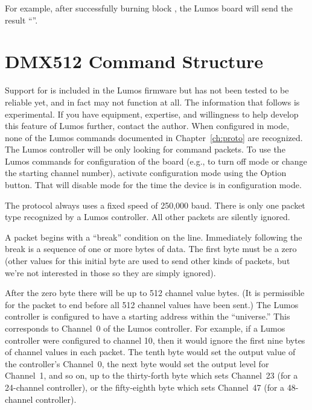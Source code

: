 \documentclass[letterpaper,twoside,onecolumn,openright,final]{memoir}
\begin{document}
For example, after successfully burning block , the Lumos board
will send the result ``''.


\chapter{DMX512 Command Structure}\label{ch:dmx}
\begin{NotImplemented*}{Support for  is included in the Lumos firmware but has not
been tested to be reliable yet, and in fact may not function at all.  The information that follows
is experimental.  If you have  equipment, expertise, and willingness to help develop
this feature of Lumos further, contact the author.}
When configured in  mode, none of the Lumos commands documented in Chapter~\ref{ch:proto}
are recognized. The Lumos controller will be only looking for  command packets.
To use the Lumos commands for configuration of the board (e.g., to turn off  mode or change
the starting channel number), activate configuration mode using the Option button.  That will disable  mode for the time the device is in configuration mode.

The  protocol always uses a fixed speed of 250,000 baud.  There is only one packet type 
recognized by a Lumos controller.  All other packets are silently ignored.

A packet begins with a ``break'' condition on the line.  Immediately following the break is a sequence
of one or more bytes of data.  The first byte must be a zero (other values for this initial byte are used
to send other kinds of  packets, but we're not interested in those so they are simply
ignored).

After the zero byte there will be up to 512 channel value bytes.  (It is permissible for the packet to end
before all 512 channel values have been sent.)  The Lumos controller is configured to have a starting address
within the  ``universe.'' This corresponds to Channel~0 of the Lumos controller.  For example,
if a Lumos controller were configured to  channel 10, then it would ignore the first nine
bytes of channel values in each packet.  The tenth byte would set the output value of the controller's Channel~0, the next byte would set the output level for Channel~1, and so on, up to the thirty-forth byte
which sets Channel~23 (for a 24-channel controller), or the fifty-eighth byte which sets Channel~47 (for
a 48-channel controller).


\end{NotImplemented*}
\end{document}

